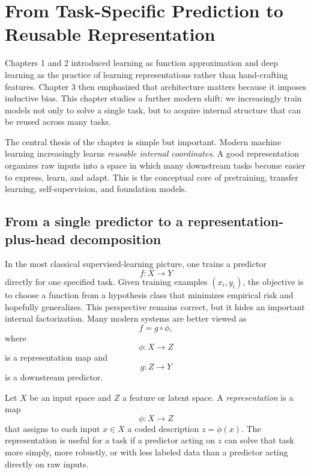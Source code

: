 \section{From Task-Specific Prediction to Reusable Representation}

Chapters 1 and 2 introduced learning as function approximation and deep learning as the practice of learning representations rather than hand-crafting features.
Chapter 3 then emphasized that architecture matters because it imposes inductive bias.
This chapter studies a further modern shift:
we increasingly train models not only to solve a single task, but to acquire internal structure that can be reused across many tasks.

\medskip

The central thesis of the chapter is simple but important.
Modern machine learning increasingly learns \emph{reusable internal coordinates}.
A good representation organizes raw inputs into a space in which many downstream tasks become easier to express, learn, and adapt.
This is the conceptual core of pretraining, transfer learning, self-supervision, and foundation models.

\subsection*{From a single predictor to a representation-plus-head decomposition}

In the most classical supervised-learning picture, one trains a predictor
\[
f : X \to Y
\]
directly for one specified task.
Given training examples \((x_i,y_i)\), the objective is to choose a function from a hypothesis class that minimizes empirical risk and hopefully generalizes.
This perspective remains correct, but it hides an important internal factorization.
Many modern systems are better viewed as
\[
f = g \circ \phi,
\]
where
\[
\phi : X \to Z
\]
is a representation map and
\[
g : Z \to Y
\]
is a downstream predictor.

\begin{definition}[Representation]
Let \(X\) be an input space and \(Z\) a feature or latent space.
A \emph{representation} is a map
\[
\phi : X \to Z
\]
that assigns to each input \(x \in X\) a coded description \(z = \phi(x)\).
The representation is useful for a task if a predictor acting on \(z\) can solve that task more simply, more robustly, or with less labeled data than a predictor acting directly on raw inputs.
\end{definition}

